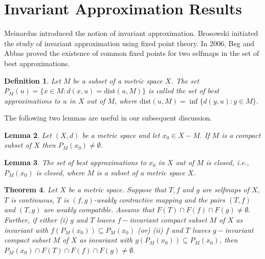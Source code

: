 \documentclass[11]{article}
\newtheorem{definition}{Definition}[section]
\newtheorem{theorem}[definition]{Theorem}
\newtheorem{lemma}[definition]{Lemma}
\numberwithin{equation}{definition}
\begin{document}
\section{Invariant Approximation Results}

Meinardus \cite{Meinardus1963} introduced the notion of invariant approximation. Brosowski \cite{Brosowski1969} initiated the study of invariant approximation using fixed point theory. In 2006, Beg and Abbas \cite{Beg2006} proved the existence of common fixed points for two selfmaps in the set of best approximations.

\begin{definition}
Let $M$ be a subset of a metric space $X$. The set $P_{M}(u)=\{x\in M:d(x,u)=\text{dist}(u,M)\}$ is called the set of best approximations to $u$ in $X$ out of $M$, where $\text{dist}(u,M)=\inf\{d(y,u):y\in M\}$.
\end{definition}

The following two lemmas are useful in our subsequent discussion.

\begin{lemma}
Let $(X,d)$ be a metric space and let $x_{0}\in X-M$. If $M$ is a compact subset of $X$ then $P_{M}(x_{0})\neq\emptyset$.
\end{lemma}

\begin{lemma}
The set of best approximations to $x_{0}$ in $X$ out of $M$ is closed, i.e., $P_{M}(x_{0})$ is closed, where $M$ is a subset of a metric space $X$.
\end{lemma}

\begin{theorem}
Let $X$ be a metric space. Suppose that $T,f$ and $g$ are selfmaps of $X$, $T$ is continuous, $T$ is $(f,g)$-weakly contractive mapping and the pairs $(T,f)$ and $(T,g)$ are weakly compatible. Assume that $F(T)\cap F(f)\cap F(g)\neq\emptyset.$ Further, if either (i) $g$ and $T$ leaves $f-$invariant compact subset $M$ of $X$ as invariant with $f(P_{M}(x_{0}))\subseteq P_{M}(x_{0})$ (or) (ii) $f$ and $T$ leaves $g-$invariant compact subset $M$ of $X$ as invariant with $g(P_{M}(x_{0}))\subseteq P_{M}(x_{0})$, then $P_{M}(x_{0})\cap F(T)\cap F(f)\cap F(g)\neq\emptyset.$
\end{theorem}
\end{document}
